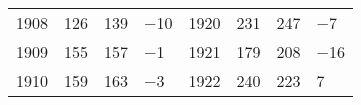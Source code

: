 \documentclass[leqno]{article}  %
\begin{document}
\begin{table}
{\begin{tabular}{p{}|p{}|p{}|p{}||p{}|p{}|p{}|p{}}
1908 & \hfill 126 & \hfill 139 & \hfill \(-\)10 \hspace*{4mm} & 1920 & \hfill 231 & \hfill 247 & \hfill \(-\)7 \hspace*{4mm} \\
1909 & \hfill 155 & \hfill 157 & \hfill \(-\)1 \hspace*{4mm} & 1921 & \hfill 179 & \hfill 208 & \hfill \(-\)16 \hspace*{4mm} \\
1910 & \hfill 159 & \hfill 163 & \hfill \(-\)3 \hspace*{4mm} & 1922 & \hfill 240 & \hfill 223 & \hfill 7 \hspace*{4mm} \\
\hline
\end{tabular}
}
\end{table}
\end{document}
